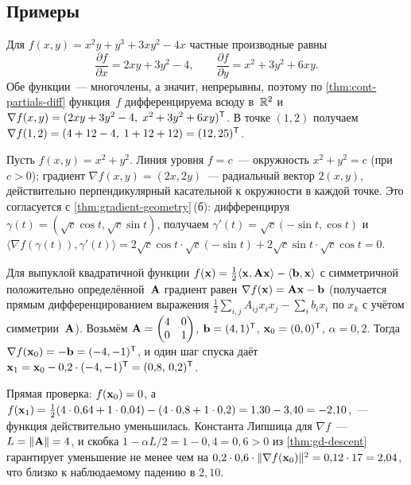 \subsection*{Примеры}

\begin{example}
\label{ex:gradient-compute}
Для $f(x, y) = x^2 y + y^3 + 3 x y^2 - 4x$ частные производные равны
\[
  \frac{\partial f}{\partial x} = 2 x y + 3 y^2 - 4, \qquad
  \frac{\partial f}{\partial y} = x^2 + 3 y^2 + 6 x y.
\]
Обе функции~--- многочлены, а значит, непрерывны, поэтому по
\cref{thm:cont-partials-diff} функция~$f$ дифференцируема всюду
в~$\mathbb{R}^2$ и $\nabla f(x, y) = (2xy + 3y^2 - 4,\; x^2 + 3y^2 + 6xy)^{\mathsf{T}}$.
В точке $(1, 2)$ получаем
$\nabla f(1, 2) = (4 + 12 - 4,\; 1 + 12 + 12) = (12, 25)^{\mathsf{T}}$.
\end{example}

\begin{example}
\label{ex:gradient-orthogonal}
Пусть $f(x, y) = x^2 + y^2$. Линия уровня $f = c$~--- окружность
$x^2 + y^2 = c$ (при $c > 0$); градиент
$\nabla f(x, y) = (2x, 2y)$~--- радиальный вектор $2(x, y)$,
действительно перпендикулярный касательной к окружности в каждой
точке. Это согласуется с \cref{thm:gradient-geometry}\,(б):
дифференцируя $\gamma(t) = (\sqrt{c}\cos t, \sqrt{c}\sin t)$,
получаем $\gamma'(t) = \sqrt{c}(-\sin t, \cos t)$ и
$\langle \nabla f(\gamma(t)), \gamma'(t) \rangle = 2\sqrt{c}\cos t \cdot \sqrt{c}(-\sin t) + 2\sqrt{c}\sin t \cdot \sqrt{c}\cos t = 0$.
\end{example}

\begin{example}
\label{ex:gd-step}
Для выпуклой квадратичной функции
$f(\mathbf{x}) = \tfrac{1}{2} \langle \mathbf{x}, \mathbf{A} \mathbf{x} \rangle - \langle \mathbf{b}, \mathbf{x} \rangle$
с симметричной положительно определённой~$\mathbf{A}$ градиент равен
$\nabla f(\mathbf{x}) = \mathbf{A}\mathbf{x} - \mathbf{b}$ (получается прямым
дифференцированием выражения
$\tfrac12 \sum_{i,j} A_{ij} x_i x_j - \sum_i b_i x_i$ по $x_k$ с учётом
симметрии~$\mathbf{A}$). Возьмём $\mathbf{A} = \begin{pmatrix} 4 & 0 \\ 0 & 1 \end{pmatrix}$,
$\mathbf{b} = (4, 1)^{\mathsf{T}}$, $\mathbf{x}_0 = (0, 0)^{\mathsf{T}}$, $\alpha = 0{,}2$.
Тогда $\nabla f(\mathbf{x}_0) = -\mathbf{b} = (-4, -1)^{\mathsf{T}}$, и один шаг
спуска даёт
$\mathbf{x}_1 = \mathbf{x}_0 - 0{,}2 \cdot (-4, -1)^{\mathsf{T}} = (0{,}8,\, 0{,}2)^{\mathsf{T}}$.

Прямая проверка: $f(\mathbf{x}_0) = 0$, а
$f(\mathbf{x}_1) = \tfrac{1}{2}(4 \cdot 0{,}64 + 1 \cdot 0{,}04) - (4 \cdot 0{,}8 + 1 \cdot 0{,}2) = 1{,}30 - 3{,}40 = -2{,}10$,~---
функция действительно уменьшилась. Константа Липшица для
$\nabla f$~--- $L = \|\mathbf{A}\| = 4$, и скобка
$1 - \alpha L / 2 = 1 - 0{,}4 = 0{,}6 > 0$ из \cref{thm:gd-descent}
гарантирует уменьшение не менее чем на
$0{,}2 \cdot 0{,}6 \cdot \|\nabla f(\mathbf{x}_0)\|^2 = 0{,}12 \cdot 17 = 2{,}04$,
что близко к наблюдаемому падению в $2{,}10$.
\end{example}

